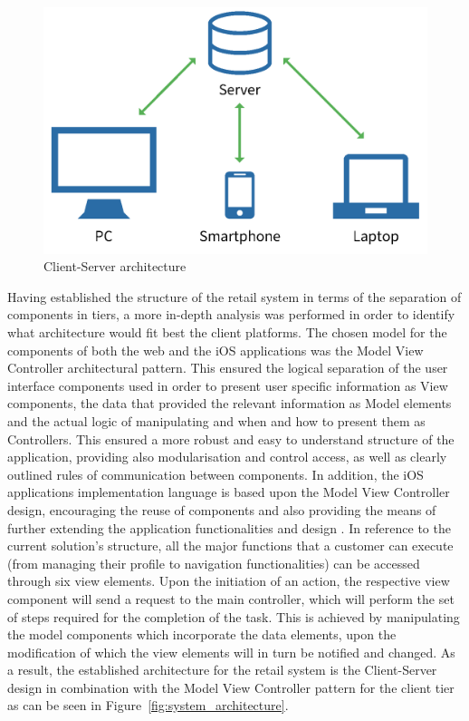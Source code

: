 \begin{figure}[!ht]
\centering
\includegraphics[scale=0.1]{img/Client_Server.png}
\caption{Client-Server architecture}
\label{fig:client_server_model}
\end{figure}

Having established the structure of the retail system in terms of the separation of components in tiers, a more in-depth analysis was performed in order to identify what architecture would fit best the client platforms. The chosen model for the components of both the web and the iOS applications was the Model View Controller architectural pattern. This ensured the logical separation of the user interface components used in order to present user specific information as View components, the data that provided the relevant information as Model elements and the actual logic of manipulating and when and how to present them as Controllers. This ensured a more robust and easy to understand structure of the application, providing also modularisation and control access, as well as clearly outlined rules of communication between components. In addition, the iOS applications implementation language is based upon the Model View Controller design, encouraging the reuse of components and also providing the means of further extending the application functionalities and design \cite{client-server_model_2017}. In reference to the current solution's structure, all the major functions that a customer can execute (from  managing their profile to navigation functionalities) can be accessed through six view elements. Upon the initiation of an action, the respective view component will send a request to the main controller, which will perform the set of steps required for the completion of the task. This is achieved by manipulating the model components which incorporate the data elements, upon the modification of which the view elements will in turn be notified and changed. As a result, the established architecture for the retail system is the Client-Server design in combination with the Model View Controller pattern for the client tier as can be seen in Figure~\ref{fig:system_architecture}.\\

